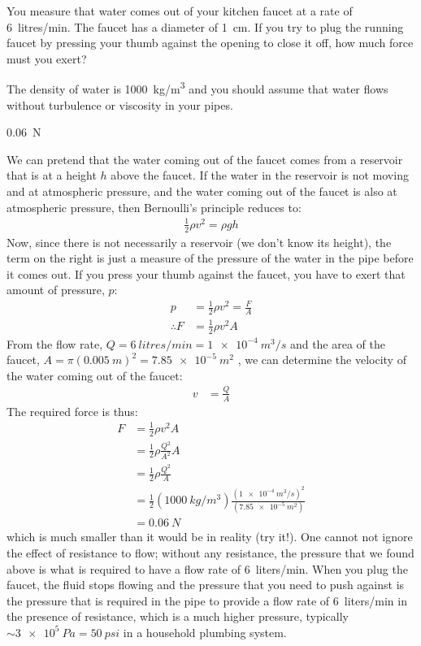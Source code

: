 \question You measure that water comes out of your kitchen faucet at a rate of \SI{6}{litres/min}. The faucet has a diameter of \SI{1}{cm}. If you try to plug the running faucet by pressing your thumb against the opening to close it off, how much force must you exert?

The density of water is \SI{1000}{kg/m^3} and you should assume that water flows without turbulence or viscosity in your pipes.
\begin{finalanswer}
	\SI{0.06}{N}
\end{finalanswer}
\begin{solution}
	We can pretend that the water coming out of the faucet comes from a reservoir that is at a height $h$ above the faucet. If the water in the reservoir is not moving and at atmospheric pressure, and the water coming out of the faucet is also at atmospheric pressure, then Bernoulli's principle reduces to:
	\begin{align*}
	\frac{1}{2}\rho v^2 = \rho g h 
	\end{align*}
	Now, since there is not necessarily a reservoir (we don't know its height), the term on the right is just a measure of the pressure of the water in the pipe before it comes out. If you press your thumb against the faucet, you have to exert that amount of pressure, $p$:
	\begin{align*}
	p &= \frac{1}{2}\rho v^2 = \frac{F}{A}\\
	\therefore F &= \frac{1}{2}\rho v^2A
	\end{align*}
	From the flow rate, $Q=\SI{6}{litres/min}=\SI{1e-4}{m^3/s}$ and the area of the faucet, $A=\pi (\SI{0.005}{m})^2=\SI{7.85e-5}{m^2}$ , we can determine the velocity of the water coming out of the faucet:
	\begin{align*}
	v&=\frac{Q}{A}
	\end{align*}
	The required force is thus:
	\begin{align*}
	F &= \frac{1}{2}\rho v^2A\\
	&= \frac{1}{2}\rho \frac{Q^2}{A^2}A\\
	&= \frac{1}{2}\rho \frac{Q^2}{A}\\
	&= \frac{1}{2}(\SI{1000}{kg/m^3})\frac{(\SI{1e-4}{m^3/s})^2}{(\SI{7.85e-5}{m^2})}\\
	&= \SI{0.06}{N}
	\end{align*}
	which is much smaller than it would be in reality (try it!). One cannot not ignore the effect of resistance to flow; without any resistance, the pressure that we found above is what is required to have a flow rate of \SI{6}{liters/min}. When you plug the faucet, the fluid stops flowing and the pressure that you need to push against is the pressure that is required in the pipe to provide a flow rate of \SI{6}{liters/min} in the presence of resistance, which is a much higher pressure, typically $\sim\SI{3e5}{Pa}=\SI{50}{psi}$ in  a household plumbing system.
\end{solution}

